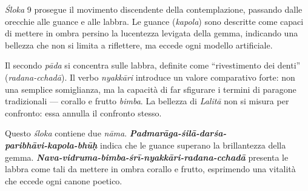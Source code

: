 \textit{Śloka} 9 prosegue il movimento discendente della contemplazione, passando dalle orecchie alle guance e alle labbra. Le guance (\textit{kapola}) sono descritte come capaci di mettere in ombra persino la lucentezza levigata della gemma, indicando una bellezza che non si limita a riflettere, ma eccede ogni modello artificiale.

Il secondo \textit{pāda} si concentra sulle labbra, definite come “rivestimento dei denti” (\textit{radana-cchadā}). Il verbo \textit{nyakkāri} introduce un valore comparativo forte: non una semplice somiglianza, ma la capacità di far sfigurare i termini di paragone tradizionali — corallo e frutto \textit{bimba}. La bellezza di \textit{Lalitā} non si misura per confronto: essa annulla il confronto stesso.

Questo \textit{śloka} contiene due \textit{nāma}.  
\textbf{\textit{Padmarāga-śilā-darśa-\\ paribhāvi-kapola-bhūḥ}} indica che le guance superano la brillantezza della gemma.  
\textbf{\textit{Nava-vidruma-bimba-śrī-nyakkāri-radana-cchadā}} presenta le labbra come tali da mettere in ombra corallo e frutto, esprimendo una vitalità che eccede ogni canone poetico.

